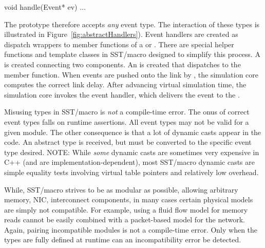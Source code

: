 \begin{CppCode}
void handle(Event* ev){
...
}
\end{CppCode}
The prototype therefore accepts \emph{any} event type. 
The interaction of these types is illustrated in Figure~\ref{fig:abstractHandlers}).
Event handlers are created as dispatch wrappers to member functions of a  or .
There are special helper functions and template classes in SST/macro designed to simplify this process.
A  is created connecting two components.
An  is created that dispatches to the  member function.
When events are pushed onto the link by ,
the simulation core computes the correct link delay.
After advancing virtual simulation time,
the simulation core invokes the event handler, which delivers the event to the .

Misusing types in SST/macro is \emph{not} a compile-time error.
The onus of correct event types falls on runtime assertions.
All event types may not be valid for a given module.
The other consequence is that a lot of dynamic casts appear in the code.
An abstract  type is received, but must be converted to the specific event type desired.
NOTE: While \emph{some} dynamic casts are sometimes very expensive in C++ (and are implementation-dependent),
most SST/macro dynamic casts are simple equality tests involving virtual table pointers and relatively low overhead.

While, SST/macro strives to be as modular as possible, allowing arbitrary memory, NIC, interconnect components,
in many cases certain physical models are simply not compatible.
For example, using a fluid flow model for memory reads cannot be easily combined with a packet-based model for the network.
Again, pairing incompatible modules is not a compile-time error.
Only when the types are fully defined at runtime can an incompatibility error be detected.

